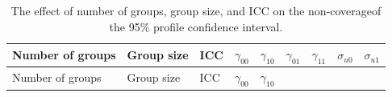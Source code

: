 \documentclass[12pt,oneside,a4paper]{reedthesis}
\begin{document}
\begin{longtable}[]{@{}lllllllll@{}}
\caption{\label{tab:tab5} The effect of number of groups, group size, and ICC on the non-coverageof the 95\% profile confidence interval.}\tabularnewline
\toprule
\begin{minipage}[b]{0.12\columnwidth}\raggedright
Number of groups\strut
\end{minipage} & \begin{minipage}[b]{0.09\columnwidth}\raggedright
Group size\strut
\end{minipage} & \begin{minipage}[b]{0.06\columnwidth}\raggedright
ICC\strut
\end{minipage} & \begin{minipage}[b]{0.08\columnwidth}\raggedright
\(\gamma_{00}\)\strut
\end{minipage} & \begin{minipage}[b]{0.08\columnwidth}\raggedright
\(\gamma_{10}\)\strut
\end{minipage} & \begin{minipage}[b]{0.08\columnwidth}\raggedright
\(\gamma_{01}\)\strut
\end{minipage} & \begin{minipage}[b]{0.08\columnwidth}\raggedright
\(\gamma_{11}\)\strut
\end{minipage} & \begin{minipage}[b]{0.08\columnwidth}\raggedright
\(\sigma_{u0}\)\strut
\end{minipage} & \begin{minipage}[b]{0.08\columnwidth}\raggedright
\(\sigma_{u1}\)\strut
\end{minipage}\tabularnewline
\midrule
\endfirsthead
\toprule
\begin{minipage}[b]{0.12\columnwidth}\raggedright
Number of groups\strut
\end{minipage} & \begin{minipage}[b]{0.09\columnwidth}\raggedright
Group size\strut
\end{minipage} & \begin{minipage}[b]{0.06\columnwidth}\raggedright
ICC\strut
\end{minipage} & \begin{minipage}[b]{0.08\columnwidth}\raggedright
\(\gamma_{00}\)\strut
\end{minipage} & \begin{minipage}[b]{0.08\columnwidth}\raggedright
\(\gamma_{10}\)\strut
\end{minipage} & \begin{minipage}[b]{0.08\columnwidth}\raggedright

\end{minipage}
\end{longtable}
\end{document}

